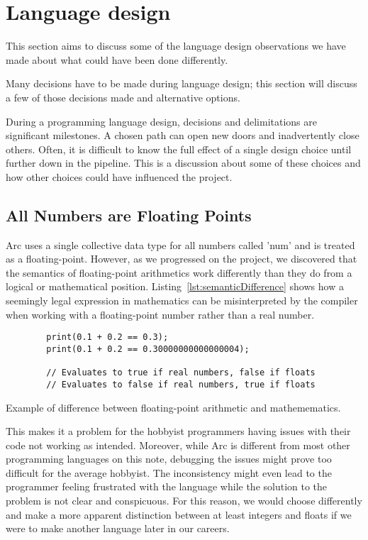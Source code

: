 \section{Language design}\label{sec:discussion_languageDesign}

This section aims to discuss some of the language design observations we have made about what could have been done differently.

Many decisions have to be made during language design; this section will discuss a few of those decisions made and alternative options.

During a programming language design, decisions and delimitations are significant milestones. A chosen path can open new doors and inadvertently close others. Often, it is difficult to know the full effect of a single design choice until further down in the pipeline. This is a discussion about some of these choices and how other choices could have influenced the project.

\subsection{All Numbers are Floating Points}

Arc uses a single collective data type for all numbers called 'num' and is treated as a floating-point. However, as we progressed on the project, we discovered that the semantics of floating-point arithmetics work differently than they do from a logical or mathematical position. Listing~\ref{lst:semanticDifference} shows how a seemingly legal expression in mathematics can be misinterpreted by the compiler when working with a floating-point number rather than a real number.

\begin{listing}[htb!]
    \begin{verbatim}
        print(0.1 + 0.2 == 0.3);
        print(0.1 + 0.2 == 0.30000000000000004);

        // Evaluates to true if real numbers, false if floats
        // Evaluates to false if real numbers, true if floats
    \end{verbatim}
    \caption{Example of difference between floating-point arithmetic and mathemematics.}
    \label{lst:semanticDifference}
\end{listing}

This makes it a problem for the hobbyist programmers having issues with their code not working as intended. Moreover, while Arc is different from most other programming languages on this note, debugging the issues might prove too difficult for the average hobbyist. The inconsistency might even lead to the programmer feeling frustrated with the language while the solution to the problem is not clear and conspicuous. For this reason, we would choose differently and make a more apparent distinction between at least integers and floats if we were to make another language later in our careers.

